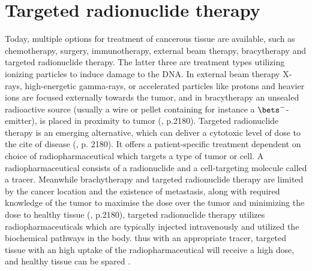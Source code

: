 \chapter{Targeted radionuclide therapy}


Today, multiple options for treatment of cancerous tissue are available, such as chemotherapy, surgery, immunotherapy, external beam therapy, bracytherapy and targeted radionuclide therapy. The latter three are treatment types utilizing ionizing particles to induce damage to the DNA. In external beam therapy X-rays, high-energetic gamma-rays, or accelerated particles like protons and heavier ions are focused externally towards the tumor, and in bracytherapy an unsealed radioactive source (usually a wire or pellet containing for instance a $\bets^-$-emitter), is placed in proximity to tumor (\cite{Vertes2011a}, p.2180). Targeted radionuclide therapy is an emerging alternative, which can deliver a cytotoxic level of dose to the cite of disease (\cite{Vertes2011a}, p. 2180). It offers a patient-specific treatment dependent on choice of radiopharmaceutical which targets a type of tumor or cell. A radiopharmaceutical consists of a radionuclide and a cell-targeting molecule called a tracer. Meanwhile brachytherapy and targeted radionuclide therapy are limited by the cancer location and the existence of metastasis, along with required knowledge of the tumor to maximise the dose over the tumor and minimizing the dose to healthy tissue (\cite{Vertes2011a}, p.2180), targeted radionuclide therapy utilizes radiopharmaceuticals which are typically injected intravenously and utilized the biochemical pathways in the body. thus with an appropriate tracer, targeted tissue with an high uptake of the radiopharmaceutical will receive a high dose, and healthy tissue can be spared \cite{Yeong2014a}.\\ 

